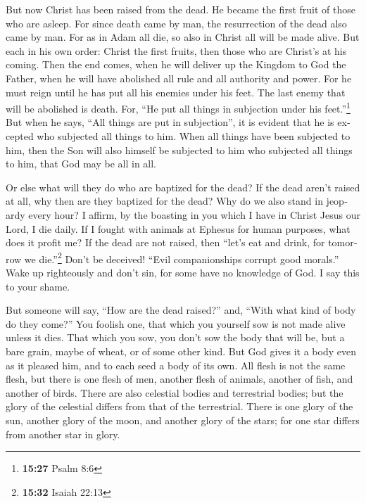 \begin{paracol}{2}
\begin{otherlanguage}{english}
 But now Christ has been raised from the dead. He became
the first fruit of those who are asleep.  For since death
came by man, the resurrection of the dead also came by man.
 For as in Adam all die, so also in Christ all will be
made alive.  But each in his own order: Christ the first
fruits, then those who are Christ's at his coming.  Then
the end comes, when he will deliver up the Kingdom to God the Father,
when he will have abolished all rule and all authority and power.
 For he must reign until he has put all his enemies under
his feet.  The last enemy that will be abolished is
death.  For, ``He put all things in subjection under his
feet.''\footnote{\textbf{15:27} Psalm 8:6} But when he says, ``All
things are put in subjection'', it is evident that he is excepted who
subjected all things to him.  When all things have been
subjected to him, then the Son will also himself be subjected to him who
subjected all things to him, that God may be all in all.

 Or else what will they do who are baptized for the dead?
If the dead aren't raised at all, why then are they baptized for the
dead?  Why do we also stand in jeopardy every hour?
 I affirm, by the boasting in you which I have in Christ
Jesus our Lord, I die daily.  If I fought with animals at
Ephesus for human purposes, what does it profit me? If the dead are not
raised, then ``let's eat and drink, for tomorrow we die.''\footnote{\textbf{15:32}
  Isaiah 22:13}  Don't be deceived! ``Evil companionships
corrupt good morals.''  Wake up righteously and don't
sin, for some have no knowledge of God. I say this to your shame.

 But someone will say, ``How are the dead raised?'' and,
``With what kind of body do they come?''  You foolish
one, that which you yourself sow is not made alive unless it dies.
 That which you sow, you don't sow the body that will be,
but a bare grain, maybe of wheat, or of some other kind. 
But God gives it a body even as it pleased him, and to each seed a body
of its own.  All flesh is not the same flesh, but there
is one flesh of men, another flesh of animals, another of fish, and
another of birds.  There are also celestial bodies and
terrestrial bodies; but the glory of the celestial differs from that of
the terrestrial.  There is one glory of the sun, another
glory of the moon, and another glory of the stars; for one star differs
from another star in glory.


\end{otherlanguage}
\end{paracol}
